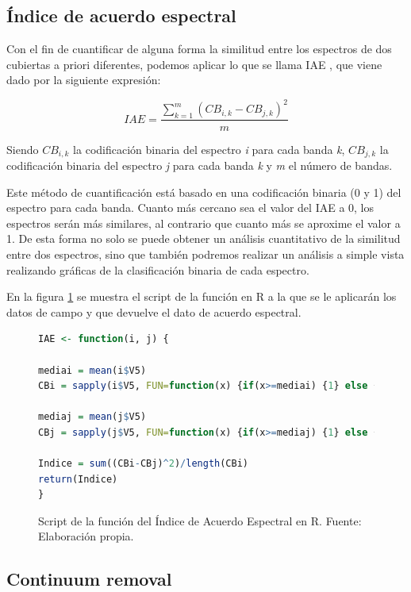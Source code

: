 \subsection{Índice de acuerdo espectral}
Con el fin de cuantificar de alguna forma la similitud entre los espectros de dos cubiertas a priori diferentes, podemos aplicar lo que se llama \ac{IAE} \citep{chuvieco2002teledeteccion}, que viene dado por la siguiente expresión:

\begin{equation} \label{eq:IAE}
	IAE = \frac{\displaystyle\sum_{k=1}^m(CB_{i,k} - CB_{j,k})^{2}}{m}
\end{equation}\Sep

Siendo $CB_{i,k}$ la codificación binaria del espectro \textit{i} para cada banda \textit{k}, $CB_{j,k}$ la codificación binaria del espectro \textit{j} para cada banda \textit{k} y \textit{m} el número de bandas.\Sep

Este método de cuantificación está basado en una codificación binaria (0 y 1) del espectro para cada banda. Cuanto más cercano sea el valor del \ac{IAE} a 0, los espectros serán más similares, al contrario que cuanto más se aproxime el valor a 1. De esta forma no solo se puede obtener un análisis cuantitativo de la similitud entre dos espectros, sino que también podremos realizar un análisis a simple vista realizando gráficas de la clasificación binaria de cada espectro.\Sep

En la figura \ref{fig:IAE} se muestra el script de la función en R a la que se le aplicarán los datos de campo y que devuelve el dato de acuerdo espectral.

\begin{figure}
\centering
\begin{lstlisting}[language = R, frame = single]
IAE <- function(i, j) {
  
mediai = mean(i$V5)
CBi = sapply(i$V5, FUN=function(x) {if(x>=mediai) {1} else {0}})
  
mediaj = mean(j$V5)
CBj = sapply(j$V5, FUN=function(x) {if(x>=mediaj) {1} else {0}})
  	
Indice = sum((CBi-CBj)^2)/length(CBi)
return(Indice)  
}
\end{lstlisting}
\caption[Función de Índice de Acuerdo Espectral]{Script de la función del Índice de Acuerdo Espectral en R. Fuente: Elaboración propia.}
\label{fig:IAE}
\end{figure}

\subsection{Continuum removal}
\label{subsec:Continuum_removal}

